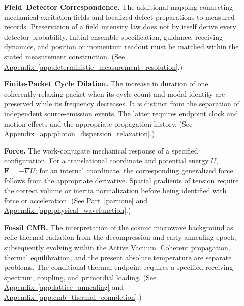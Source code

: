 \begin{description}
\item[] \begin{minipage}[t]{\linewidth}
\textbf{Field--Detector Correspondence.} The additional mapping connecting mechanical excitation fields and localized defect preparations to measured records. Preservation of a field intensity law does not by itself derive every detector probability. Initial ensemble specification, guidance, receiving dynamics, and position or momentum readout must be matched within the stated measurement construction.
(See \hyperref[app:deterministic_measurement_resolution]{Appendix~\ref*{app:deterministic_measurement_resolution}}.)
\end{minipage}

\item[] \begin{minipage}[t]{\linewidth}
\textbf{Finite-Packet Cycle Dilation.} The increase in duration of one coherently relaxing packet when its cycle count and modal identity are preserved while its frequency decreases. It is distinct from the separation of independent source-emission events. The latter requires endpoint clock and motion effects and the appropriate propagation history.
(See \hyperref[app:photon_dispersion_relaxation]{Appendix~\ref*{app:photon_dispersion_relaxation}}.)
\end{minipage}

\item[] \begin{minipage}[t]{\linewidth}
\textbf{Force.} The work-conjugate mechanical response of a specified configuration. For a translational coordinate and potential energy $U$, $\mathbf F=-\nabla U$; for an internal coordinate, the corresponding generalized force follows from the appropriate derivative. Spatial gradients of tension require the correct volume or inertia normalization before being identified with force or acceleration.
(See \hyperref[part:one]{Part~\ref*{part:one}} and \hyperref[app:physical_wavefunction]{Appendix~\ref*{app:physical_wavefunction}}.)
\end{minipage}

\item[] \begin{minipage}[t]{\linewidth}
\textbf{Fossil CMB.} The interpretation of the cosmic microwave background as relic thermal radiation from the decompression and early annealing epoch, subsequently evolving within the Active Vacuum. Coherent propagation, thermal equilibration, and the present absolute temperature are separate problems. The conditional thermal endpoint requires a specified receiving spectrum, coupling, and primordial loading.
(See \hyperref[app:lattice_annealing]{Appendix~\ref*{app:lattice_annealing}} and \hyperref[app:cmb_thermal_completion]{Appendix~\ref*{app:cmb_thermal_completion}}.)
\end{minipage}


\end{description}
